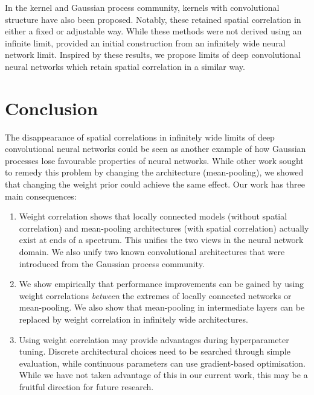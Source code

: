 \documentclass[accepted]{uai2021} %
\newcommand{\0}{\boldsymbol{0}}
\newcommand{\1}{\boldsymbol{1}}
\begin{document}
In the kernel and Gaussian process community, kernels with convolutional structure have also been proposed. Notably, these retained spatial correlation in either a fixed \citep{vdw2017convgp} or adjustable \citep{mairal2014ckn,dutordoir2020} way. While these methods were not derived using an infinite limit,  provided an initial construction from an infinitely wide neural network limit. Inspired by these results, we propose limits of deep convolutional neural networks which retain spatial correlation in a similar way.

\section{Conclusion}
The disappearance of spatial correlations in infinitely wide limits of deep convolutional neural networks could be seen as another example of how Gaussian processes lose favourable properties of neural networks. While other work sought to remedy this problem by changing the architecture (mean-pooling), we showed that changing the weight prior could achieve the same effect. Our work has three main consequences:
\begin{enumerate}
    \item Weight correlation shows that locally connected models (without spatial correlation) and mean-pooling architectures (with spatial correlation) actually exist at ends of a spectrum. This unifies the two views in the neural network domain. We also unify two known convolutional architectures that were introduced from the Gaussian process community.
    \item We show empirically that performance improvements can be gained by using weight correlations \emph{between} the extremes of locally connected networks or mean-pooling. We also show that mean-pooling in intermediate layers can be replaced by weight correlation in infinitely wide architectures.
    \item Using weight correlation may provide advantages during hyperparameter tuning. Discrete architectural choices need to be searched through simple evaluation, while continuous parameters can use gradient-based optimisation. While we have not taken advantage of this in our current work, this may be a fruitful direction for future research.
\end{enumerate}

\end{document}
